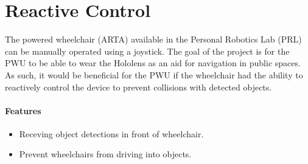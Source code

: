 \section{Reactive Control}
The powered wheelchair (ARTA) available in the Personal Robotics Lab (PRL) can be manually operated using a joystick. The goal of the project is for the PWU to be able to wear the Hololens as an aid for navigation in public spaces. As such, it would be beneficial for the PWU if the wheelchair had the ability to reactively control the device to prevent collisions with detected objects.

\paragraph{Features}
\begin{itemize}
	\item Receving object detections in front of wheelchair.
	\item Prevent wheelchairs from driving into objects.
\end{itemize}

